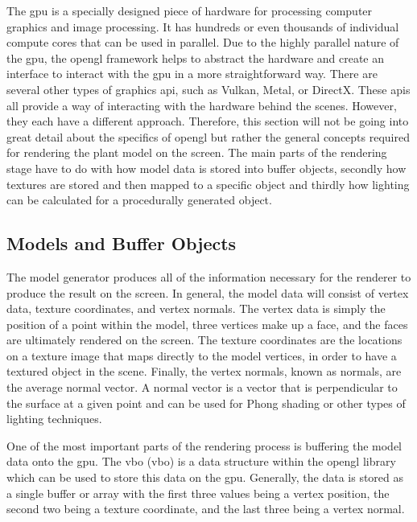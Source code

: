 The \acrshort{gpu} is a specially designed piece of hardware for processing computer graphics and image processing. It has hundreds or even thousands of individual compute cores that can be used in parallel. Due to the highly parallel nature of the \acrshort{gpu}, the \acrshort{opengl} framework helps to abstract the hardware and create an interface to interact with the \acrshort{gpu} in a more straightforward way. There are several other types of graphics \acrshort{api}, such as Vulkan, Metal, or DirectX. These \acrshort{api}s all provide a way of interacting with the hardware behind the scenes. However, they each have a different approach. Therefore, this section will not be going into great detail about the specifics of \acrshort{opengl} but rather the general concepts required for rendering the plant model on the screen. The main parts of the rendering stage have to do with how model data is stored into buffer objects, secondly how textures are stored and then mapped to a specific object and thirdly how lighting can be calculated for a procedurally generated object.

\subsection{Models and Buffer Objects}

The model generator produces all of the information necessary for the renderer to produce the result on the screen. In general, the model data will consist of vertex data, texture coordinates, and vertex normals. The vertex data is simply the position of a point within the model, three vertices make up a face, and the faces are ultimately rendered on the screen. The texture coordinates are the locations on a texture image that maps directly to the model vertices, in order to have a textured object in the scene. Finally, the vertex normals, known as normals, are the average normal vector. A normal vector is a vector that is perpendicular to the surface at a given point and can be used for Phong shading or other types of lighting techniques.  

One of the most important parts of the rendering process is buffering the model data onto the \acrshort{gpu}. The \acrlong{vbo} (\acrshort{vbo}) is a data structure within the \acrshort{opengl} library which can be used to store this data on the \acrshort{gpu}. Generally, the data is stored as a single buffer or array with the first three values being a vertex position, the second two being a texture coordinate, and the last three being a vertex normal.

